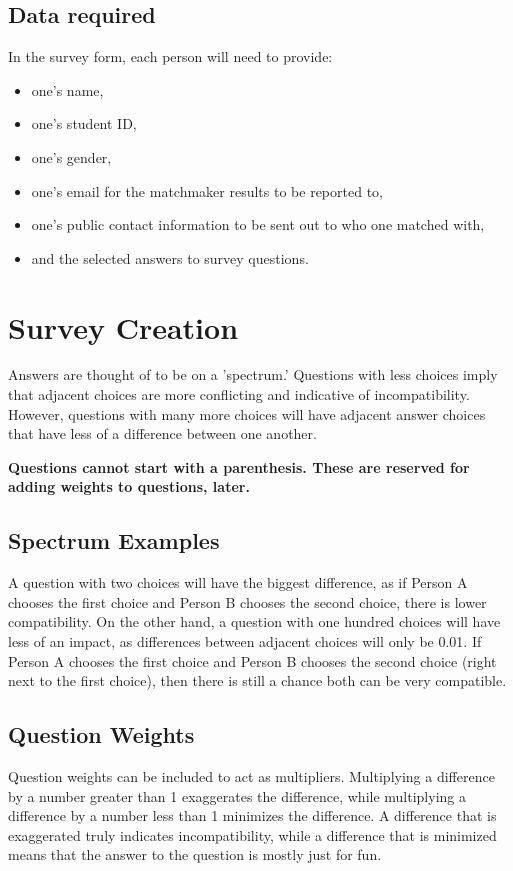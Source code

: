 \documentclass[12pt]{article}
\begin{document}
\subsection{Data required}
In the survey form, each person will need to provide:
\begin{itemize}
    \item one's name,
    \item one's student ID,
    \item one's gender,
    \item one's email for the matchmaker results to be reported to,
    \item one's public contact information to be sent out to who one matched with,
    \item and the selected answers to survey questions.
\end{itemize}

\section{Survey Creation}
Answers are thought of to be on a 'spectrum.' Questions with less choices imply
that adjacent choices are more conflicting and indicative of incompatibility.
However, questions with many more choices will have adjacent answer choices that
have less of a difference between one another.

\textbf{Questions cannot start with a parenthesis. These are reserved for adding
weights to questions, later.}

\subsection{Spectrum Examples}
A question with two choices will have the biggest difference, as if Person A
chooses the first choice and Person B chooses the second choice, there is lower
compatibility. On the other hand, a question with one hundred choices will have
less of an impact, as differences between adjacent choices will only be 0.01. If
Person A chooses the first choice and Person B chooses the second choice (right
next to the first choice), then there is still a chance both can be very
compatible.

\subsection{Question Weights}
Question weights can be included to act as multipliers. Multiplying a difference
by a number greater than 1 exaggerates the difference, while multiplying a
difference by a number less than 1 minimizes the difference. A difference that
is exaggerated truly indicates incompatibility, while a difference that is
minimized means that the answer to the question is mostly just for fun.
\end{document}
